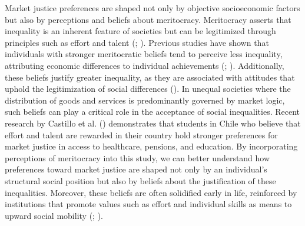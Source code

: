 \documentclass[
  12pt,
]{article}
\begin{document}
Market justice preferences are shaped not only by objective
socioeconomic factors but also by perceptions and beliefs about
meritocracy. Meritocracy asserts that inequality is an inherent feature
of societies but can be legitimized through principles such as effort
and talent (;
). Previous studies have
shown that individuals with stronger meritocratic beliefs tend to
perceive less inequality, attributing economic differences to individual
achievements (;
). Additionally, these
beliefs justify greater inequality, as they are associated with
attitudes that uphold the legitimization of social differences
(). In unequal
societies where the distribution of goods and services is predominantly
governed by market logic, such beliefs can play a critical role in the
acceptance of social inequalities. Recent research by Castillo et al.
() demonstrates that
students in Chile who believe that effort and talent are rewarded in
their country hold stronger preferences for market justice in access to
healthcare, pensions, and education. By incorporating perceptions of
meritocracy into this study, we can better understand how preferences
toward market justice are shaped not only by an individual's structural
social position but also by beliefs about the justification of these
inequalities. Moreover, these beliefs are often solidified early in
life, reinforced by institutions that promote values such as effort and
individual skills as means to upward social mobility
(;
).
\end{document}
